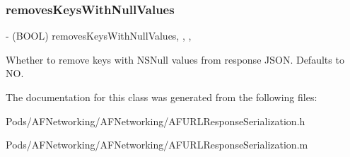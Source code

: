 \subsubsection{\texorpdfstring{removes\+Keys\+With\+Null\+Values}{removesKeysWithNullValues}}
{\footnotesize\ttfamily -\/ (B\+O\+OL) removes\+Keys\+With\+Null\+Values\hspace{0.3cm}{\ttfamily [read]}, {\ttfamily [write]}, {\ttfamily [nonatomic]}, {\ttfamily [assign]}}

Whether to remove keys with {\ttfamily N\+S\+Null} values from response J\+S\+ON. Defaults to {\ttfamily NO}. 

The documentation for this class was generated from the following files\+:\begin{DoxyCompactItemize}
\item 
Pods/\+A\+F\+Networking/\+A\+F\+Networking/A\+F\+U\+R\+L\+Response\+Serialization.\+h\item 
Pods/\+A\+F\+Networking/\+A\+F\+Networking/A\+F\+U\+R\+L\+Response\+Serialization.\+m\end{DoxyCompactItemize}
